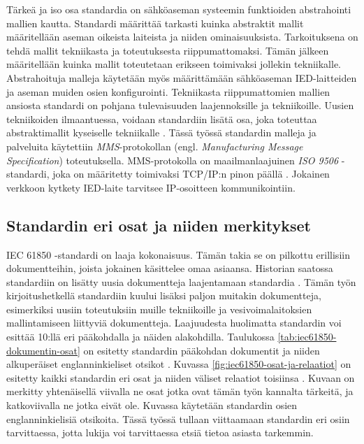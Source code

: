 Tärkeä ja iso osa standardia on sähköaseman systeemin funktioiden abstrahointi mallien kautta. Standardi määrittää tarkasti kuinka abstraktit mallit määritellään aseman oikeista laiteista ja niiden ominaisuuksista. Tarkoituksena on tehdä mallit tekniikasta ja toteutuksesta riippumattomaksi. Tämän jälkeen määritellään kuinka mallit toteutetaan erikseen toimivaksi jollekin tekniikalle. Abstrahoituja malleja käytetään myös määrittämään sähköaseman IED-laitteiden ja aseman muiden osien konfigurointi. Tekniikasta riippumattomien mallien ansiosta standardi on pohjana tulevaisuuden laajennoksille ja tekniikoille. Uusien tekniikoiden ilmaantuessa, voidaan standardiin lisätä  osa, joka  toteuttaa abstraktimallit kyseiselle tekniikalle \mbox{\cite[s.~2]{Brunner2008}}. Tässä työssä standardin malleja ja palveluita käytettiin \emph{MMS}-protokollan (engl. \emph{Manufacturing Message Specification}) toteutuksella. MMS-protokolla on maailmanlaajuinen \emph{ISO 9506} -standardi, joka on määritetty toimivaksi TCP/IP:n pinon päällä \mbox{\cite{MMS-protocol-stack-and-API}}. Jokainen verkkoon kytkety IED-laite tarvitsee IP-osoitteen kommunikointiin.


\subsection{Standardin eri osat ja niiden merkitykset}	
IEC 61850 -standardi on laaja kokonaisuus. Tämän takia se on pilkottu erillisiin dokumentteihin, joista jokainen käsittelee omaa asiaansa. Historian saatossa standardiin on lisätty uusia dokumentteja laajentamaan standardia \mbox{\cite{IEC61850series, New-documents-by-IEC-TC-57}} \mbox{\cite[s.~13]{IEC61850-1}}. Tämän työn kirjoitushetkellä standardiin kuului lisäksi paljon muitakin dokumentteja, esimerkiksi uusiin toteutuksiin muille tekniikoille ja vesivoimalaitoksien mallintamiseen liittyviä dokumentteja. Laajuudesta huolimatta standardin voi esittää 10:llä eri pääkohdalla ja näiden alakohdilla. Taulukossa \ref{tab:iec61850-dokumentin-osat} on esitetty standardin pääkohdan dokumentit ja niiden alkuperäiset englanninkieliset otsikot \mbox{\cite{IEC61850series}}. Kuvassa \ref{fig:iec61850-osat-ja-relaatiot} on esitetty kaikki standardin eri osat ja niiden väliset relaatiot toisiinsa \mbox{\cite[s.~22]{IEC61850-1}}. Kuvaan on merkitty yhtenäisellä viivalla ne osat jotka ovat tämän työn kannalta tärkeitä, ja katkoviivalla ne jotka eivät ole. Kuvassa käytetään standardin osien englanninkielisiä otsikoita. Tässä työssä tullaan viittaamaan standardin eri osiin tarvittaessa, jotta lukija voi tarvittaessa etsiä tietoa asiasta tarkemmin.

